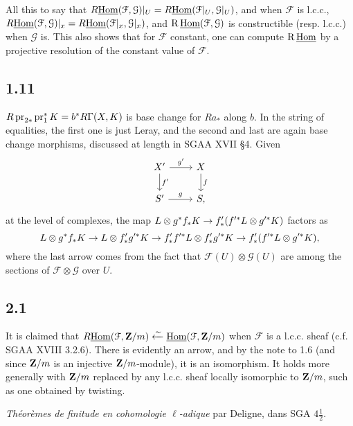 \documentclass[deligne.tex]{subfiles}
\begin{document}
	All this to say that $R\underline{\operatorname{Hom}}(\mathcal F,\mathcal G)|_U=
	R\underline{\operatorname{Hom}}(\mathcal F|_U,\mathcal G|_U)$, and when $\mathcal F$
	is l.c.c.,
	$R\underline{\operatorname{Hom}}(\mathcal F,\mathcal G)|_x=
	R\underline{\operatorname{Hom}}(\mathcal F|_x,\mathcal G|_x)$, and
	$\operatorname{R}\underline{\operatorname{Hom}}(\mathcal F,\mathcal G)$ is constructible (resp. l.c.c.)
	when $\mathcal G$ is. This also shows that for $\mathcal F$ constant,
	one can compute $\operatorname{R}\underline{\operatorname{Hom}}$ by a projective resolution of the
	constant value of $\mathcal F$.
	
	\subsection*{1.11} $R\operatorname{pr}_{2*}\operatorname{pr}_1^*K=b^*R\Gamma(X,K)$ is base change
	for $Ra_*$ along $b$. In the string of equalities, the first one is
	just Leray, and the second and last are again base change morphisms,
	discussed at length in SGAA XVII \S4. Given
	\begin{equation*}\begin{tikzcd}
		X'\arrow[r,"g'"]\arrow[d,"f'"]&X\arrow[d,"f"] \\
		S'\arrow[r,"g"]&S,
	\end{tikzcd}\end{equation*}
	at the level of complexes, the map
	$L\otimes g^*f_*K\rightarrow f'_*(f'^*L\otimes g'^*K)$ factors as
	\begin{equation*}
		L\otimes g^*f_*K\rightarrow L\otimes f'_*g'^*K\rightarrow f'_*f'^*L\otimes f'_*g'^*K
		\rightarrow f'_*(f'^*L\otimes g'^*K),
	\end{equation*}
	where the last arrow comes from the fact that
	$\mathscr F(U)\otimes\mathscr G(U)$ are among the sections of
	$\mathscr F\otimes \mathscr G$ over $U$.
	
	\subsection*{2.1}\label{thfin:2.1} It is claimed that
	$R\underline{\operatorname{Hom}}(\mathcal F,\mathbf Z/m)\xleftarrow{\sim}\underline{\operatorname{Hom}}(\mathcal F,\mathbf Z/m)$
	when $\mathcal F$ is a l.c.c. sheaf (c.f. SGAA XVIII 3.2.6).
	There is evidently an arrow, and by the note to 1.6 (and since $\mathbf{Z}/m$ is
	an injective $\mathbf{Z}/m$-module), it is an isomorphism.
	It holds more generally with $\mathbf{Z}/m$ replaced by any l.c.c. sheaf locally
	isomorphic to $\mathbf{Z}/m$, such as one obtained by twisting.

\begin{thebibliography}{Th. finitude}
	 \textit{Théorèmes de finitude en cohomologie $\ell$-adique} par Deligne,
	dans SGA $4\frac12$.
\end{thebibliography}
\end{document}
